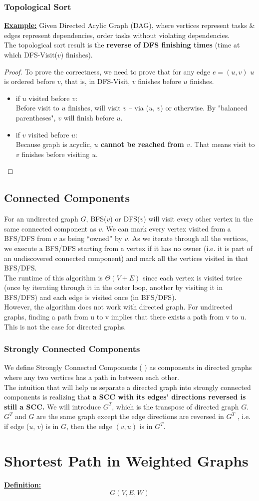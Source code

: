 \documentclass[a4paper]{article}
\renewcommand{\sb}{\vspace*{4px} \\}
\begin{document}
\subsubsection*{Topological Sort}
\textbf{\underline{Example:}} Given Directed Acylic Graph (DAG), where vertices represent tasks \& edges 
represent dependencies, order tasks without violating dependencies. \sb
The topological sort result 
is the \textbf{reverse of DFS finishing times} (time at which DFS-Visit($v$) finishes).
\begin{proof}
    To prove the correctness, we need to prove that for any edge $e=(u,v)$ 
    $u$ is ordered before $v$, that is, in DFS-Visit, 
    $v$ finishes before $u$ finishes. \begin{itemize}
        \item if $u$ visited before $v$: \sb
        Before visit to $u$ finishes, will visit $v$ -- via ($u$, $v$) or otherwise. 
        By "balanced parentheses", $v$ will finish before $u$.
        \item if $v$ visited before $u$: \sb
        Because graph is acyclic, \textbf{$u$ cannot be reached from $v$}. That means 
        visit to $v$ finishes before visiting $u$.
    \end{itemize}
\end{proof}

\subsection{Connected Components}

For an undirected graph $G$, BFS($v$) or DFS($v$) will visit every other vertex 
in the same connected component as $v$. We can mark every vertex visited from a 
BFS/DFS from $v$ as being “owned” by $v$. As we iterate through all the 
vertices, we execute a 
BFS/DFS starting from a vertex if it has no owner (i.e. it is part of an 
undiscovered connected component) and mark all the vertices visited in that 
BFS/DFS.\sb
%
The runtime of this algorithm is $\Theta(V + E)$ since each vertex is visited 
twice (once by iterating through it in the outer loop, another by visiting it 
in BFS/DFS) and each edge is visited once (in BFS/DFS).\sb
However, the algorithm does not work with directed graph. For undirected graphs, 
finding a path from u to v implies that there exists a path from v to u. This 
is not the case for directed graphs. 

\subsubsection*{Strongly Connected Components}
We define Strongly Connected Components ( ) as components in directed graphs where any two vertices has a 
path in between each other. \sb
%
The intuition that will help us separate a directed graph into strongly 
connected components is realizing that \textbf{a SCC with its edges’ directions 
reversed is still a SCC.} We will introduce $G^T$, which is the transpose 
of directed graph $G$. $G^T$ and $G$ are the same graph except the edge 
directions are reversed in $G^T$ , i.e. if edge ($u$, $v$) is in $G$, then 
the edge $(v,u)$ is in $G^T$.


\section{Shortest Path in Weighted Graphs}
\underline{\textbf{Definition:}}
\[ G(V, E, W) \]
\end{document}
